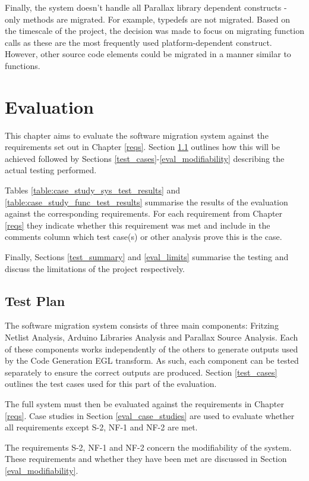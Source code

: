 \documentclass{UoYCSproject}
\begin{document}
Finally, the system doesn't handle all Parallax library dependent constructs - only methods are migrated. For example, typedefs are not migrated. Based on the timescale of the project, the decision was made to focus on migrating function calls as these are the most frequently used platform-dependent construct. However, other source code elements could be migrated in a manner similar to functions.

\chapter{Evaluation} \label{eval_chapt}
This chapter aims to evaluate the software migration system against the requirements set out in Chapter \ref{reqs}. Section \ref{test_plan} outlines how this will be achieved followed by Sections \ref{test_cases}-\ref{eval_modifiability} describing the actual testing performed.

Tables \ref{table:case_study_sys_test_results} and \ref{table:case_study_func_test_results} summarise the results of the evaluation against the corresponding requirements. For each requirement from Chapter \ref{reqs} they indicate whether this requirement was met and include in the comments column which test case(s) or other analysis prove this is the case.

Finally, Sections \ref{test_summary} and \ref{eval_limits} summarise the testing and discuss the limitations of the project respectively.

\section{Test Plan} \label{test_plan}
The software migration system consists of three main components: Fritzing Netlist Analysis, Arduino Libraries Analysis and Parallax Source Analysis. Each of these components works independently of the others to generate outputs used by the Code Generation EGL transform. As such, each component can be tested separately to ensure the correct outputs are produced. Section \ref{test_cases} outlines the test cases used for this part of the evaluation.

The full system must then be evaluated against the requirements in Chapter \ref{reqs}. Case studies in Section \ref{eval_case_studies} are used to evaluate whether all requirements except S-2, NF-1 and NF-2 are met.

The requirements S-2, NF-1 and NF-2 concern the modifiability of the system. These requirements and whether they have been met are discussed in Section \ref{eval_modifiability}.
	
\end{document}

